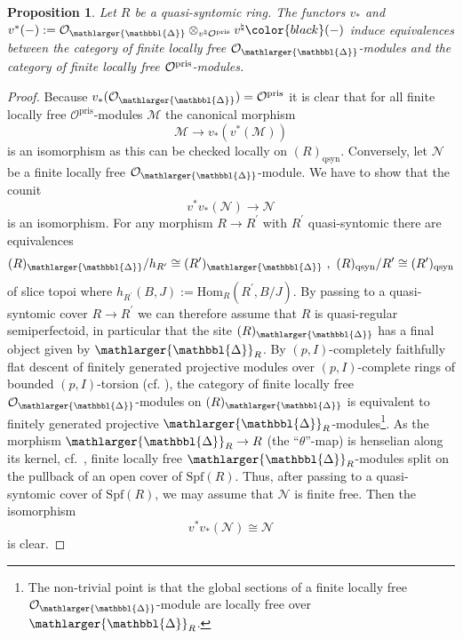 \documentclass{amsart}
\newcommand{\prism}{{\mathlarger{\mathbbl{\Delta}}}}
\theoremstyle{plain}
\newtheorem{proposition}[theorem]{Proposition}
\theoremstyle{definition}
\newcommand{\pris}{\mathrm{pris}}
\newcommand{\Spf}{\mathrm{Spf}}
\newcommand{\green}[1]{{\color{black}#1}}
\newcommand{\blue}[1]{{\color{black}#1}}
\begin{document}
\begin{proposition}
 \label{sec:abstr-divid-prism-proposition-finite-locally-free}
Let $R$ be a quasi-syntomic ring. The functors $v_*$ and \blue{$v^{\ast}(-):=\mathcal{O}_{\prism}\otimes_{v^{\natural}\mathcal{O}^\pris}v^{\natural}\green{(-)}$} induce equivalences between the category of finite locally free $\mathcal{O}_{\prism}$-modules and the category of finite locally free $\mathcal{O}^{\rm pris}$-modules. 
\end{proposition}
\begin{proof}
  Because $v_\ast(\mathcal{O}_\prism)=\mathcal{O}^\pris$ it is clear that for all finite locally free $\mathcal{O}^\pris$-modules $\mathcal{M}$ the canonical morphism
    $$
    \mathcal{M}\to v_{\ast}(v^\ast(\mathcal{M}))
    $$
    is an isomorphism as this can be checked locally on $(R)_{\mathrm{qsyn}}$. Conversely, let $\mathcal{N}$ be a finite locally free $\mathcal{O}_\prism$-module. We have to show that the counit
    $$
    v^{\ast}v_\ast(\mathcal{N})\to \mathcal{N}
    $$
    is an isomorphism.
    For any morphism $R\to R^\prime$ with $R^\prime$ quasi-syntomic there are equivalences
    $$
    (R)_\prism/h_{R^\prime}\cong (R^\prime)_{\prism}\ ,\ (R)_{\mathrm{qsyn}}/{R^\prime}\cong (R^\prime)_{\mathrm{qsyn}}
    $$
    of slice topoi where $h_{R^\prime}(B,J):=\mathrm{Hom}_R(R^\prime,B/J)$. By passing to a quasi-syntomic cover $R\to R^\prime$ we can therefore assume that $R$ is quasi-regular semiperfectoid, in particular that the site $(R)_{\prism}$ has a final object given by $\prism_R$. By $(p,I)$-completely faithfully flat descent of finitely generated projective modules over $(p,I)$-complete rings of bounded $(p,I)$-torsion (cf. ), the category of finite locally free $\mathcal{O}_\prism$-modules on $(R)_{\prism}$ is equivalent to finitely generated projective $\prism_R$-modules\footnote{The non-trivial point is that the global sections of a finite locally free $\mathcal{O}_{\prism}$-module are locally free over $\prism_R$.}.
    As the morphism $\prism_R\to R$ (the ``$\theta$''-map) is henselian along its kernel, cf.\ , finite locally free $\prism_R$-modules split on the pullback of an open cover of $\Spf(R)$. Thus, after passing to a quasi-syntomic cover of $\mathrm{Spf}(R)$, we may assume that $\mathcal{N}$ is finite free. Then the isomorphism
    $$
    v^\ast v_\ast(\mathcal{N})\cong \mathcal{N}
    $$
    is clear.
\end{proof}
\end{document}
